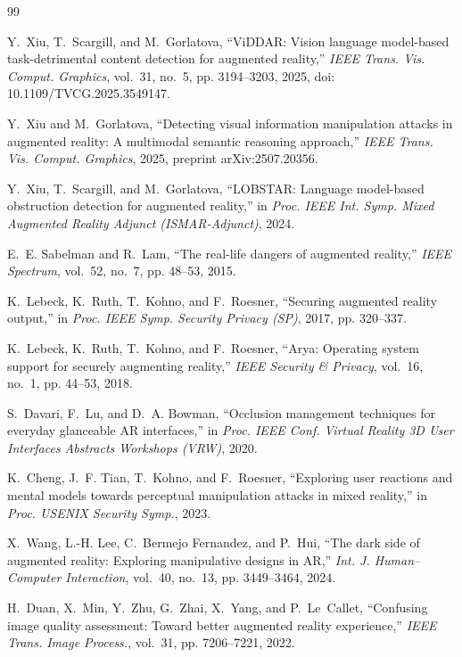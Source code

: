 \documentclass[journal,onecolumn]{IEEEtran}
\begin{document}
\begin{thebibliography}{99}

Y.~Xiu, T.~Scargill, and M.~Gorlatova, ``{ViDDAR}: Vision language model-based task-detrimental
content detection for augmented reality,'' \emph{IEEE Trans. Vis. Comput. Graphics}, vol.~31, no.~5,
pp. 3194--3203, 2025, doi: 10.1109/TVCG.2025.3549147.

Y.~Xiu and M.~Gorlatova, ``Detecting visual information manipulation attacks in augmented reality: A
multimodal semantic reasoning approach,'' \emph{IEEE Trans. Vis. Comput. Graphics}, 2025, preprint
arXiv:2507.20356.

Y.~Xiu, T.~Scargill, and M.~Gorlatova, ``{LOBSTAR}: Language model-based obstruction detection for
augmented reality,'' in \emph{Proc. IEEE Int. Symp. Mixed Augmented Reality Adjunct (ISMAR-Adjunct)},
2024.

E.~E. Sabelman and R.~Lam, ``The real-life dangers of augmented reality,'' \emph{IEEE Spectrum},
vol.~52, no.~7, pp. 48--53, 2015.

K.~Lebeck, K.~Ruth, T.~Kohno, and F.~Roesner, ``Securing augmented reality output,'' in \emph{Proc.
IEEE Symp. Security Privacy (SP)}, 2017, pp. 320--337.

K.~Lebeck, K.~Ruth, T.~Kohno, and F.~Roesner, ``Arya: Operating system support for securely augmenting
reality,'' \emph{IEEE Security \& Privacy}, vol.~16, no.~1, pp. 44--53, 2018.

S.~Davari, F.~Lu, and D.~A. Bowman, ``Occlusion management techniques for everyday glanceable {AR}
interfaces,'' in \emph{Proc. IEEE Conf. Virtual Reality 3D User Interfaces Abstracts Workshops (VRW)},
2020.

K.~Cheng, J.~F. Tian, T.~Kohno, and F.~Roesner, ``Exploring user reactions and mental models towards
perceptual manipulation attacks in mixed reality,'' in \emph{Proc. USENIX Security Symp.}, 2023.

X.~Wang, L.-H. Lee, C.~Bermejo Fernandez, and P.~Hui, ``The dark side of augmented reality: Exploring
manipulative designs in {AR},'' \emph{Int. J. Human--Computer Interaction}, vol.~40, no.~13,
pp. 3449--3464, 2024.

H.~Duan, X.~Min, Y.~Zhu, G.~Zhai, X.~Yang, and P.~Le~Callet, ``Confusing image quality assessment:
Toward better augmented reality experience,'' \emph{IEEE Trans. Image Process.}, vol.~31,
pp. 7206--7221, 2022.


\end{thebibliography}
\end{document}

